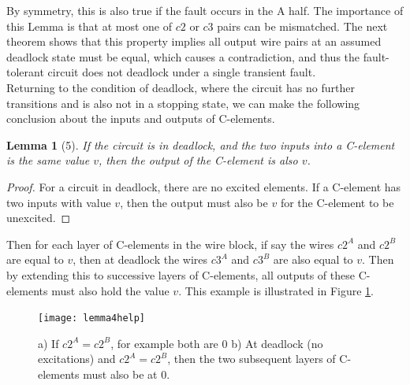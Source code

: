 \documentclass[12pt]{report}
\newtheorem*{corollary}{Corollary}
\newtheorem*{lemma}{Lemma}
\begin{document}
By symmetry, this is also true if the fault occurs in the A half.  
The importance of this Lemma is that at most one of $c2$ or $c3$ pairs can be mismatched.  The next theorem shows that this property implies all output wire pairs at an assumed deadlock state must be equal, which causes a contradiction, and thus the fault-tolerant circuit does not deadlock under a single transient fault.\\

Returning to the condition of deadlock, where the circuit has no further transitions and is also not in a stopping state, we can make the following conclusion about the inputs and outputs of C-elements.
\begin{lemma}[5]
If the circuit is in deadlock, and the two inputs into a C-element is the same value $v$, then the output of the C-element is also $v$.
\end{lemma}
\begin{proof}
For a circuit in deadlock, there are no excited elements.  If a C-element has two inputs with value $v$, then the output must also be $v$ for the C-element to be unexcited.
\end{proof}
Then for each layer of C-elements in the wire block, if say the wires $c2^A$ and $c2^B$ are equal to $v$, then at deadlock the wires $c3^A$ and $c3^B$ are also equal to $v$.  Then by extending this to successive layers of C-elements, all outputs of these C-elements must also hold the value $v$.  This example is illustrated in Figure \ref{fig:t2}.

\begin{figure}
  \centering
    \texttt{[image: lemma4help]}
  \caption{a) If $c2^A=c2^B$, for example both are 0  b) At deadlock (no excitations) and $c2^A=c2^B$, then the two subsequent layers of C-elements must also be at 0. }
  \label{fig:t2}
\end{figure}

\end{document}
